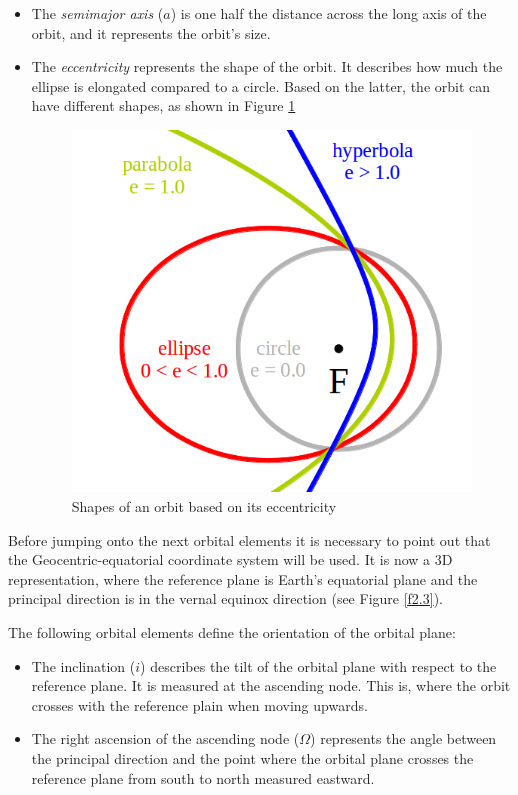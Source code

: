 \begin{itemize}
\item The \emph{semimajor axis} ($a$) is one half the distance across the long axis of the orbit, and it represents the orbit's size.
\item The \emph{eccentricity} represents the shape of the orbit. It describes how much the ellipse is elongated compared to a circle. Based on the latter, the orbit can have different shapes, as shown in Figure \ref{f2.2}

\begin{figure}[H]
\centerline{\includegraphics[scale=0.35]{images/Eccentricity.png}}
\caption{Shapes of an orbit based on its eccentricity}
\label{f2.2}
\end{figure}

\end{itemize}


Before jumping onto the next orbital elements it is necessary to point out that the Geocentric-equatorial coordinate system will be used. It is now a 3D representation, where the reference plane is Earth's equatorial plane and the principal direction is in the vernal equinox direction (see Figure \ref{f2.3}).

The following orbital elements define the orientation of the orbital plane:

\begin{itemize}
\item The inclination ($i$) describes the tilt of the orbital plane with respect to the reference plane. It is measured at the ascending node. This is, where the orbit crosses with the reference plain when moving upwards.
\item The right ascension of the ascending node ($\Omega$) represents the angle between the principal direction and the point where the orbital plane crosses the reference plane from south to north measured eastward. 
\end{itemize}


